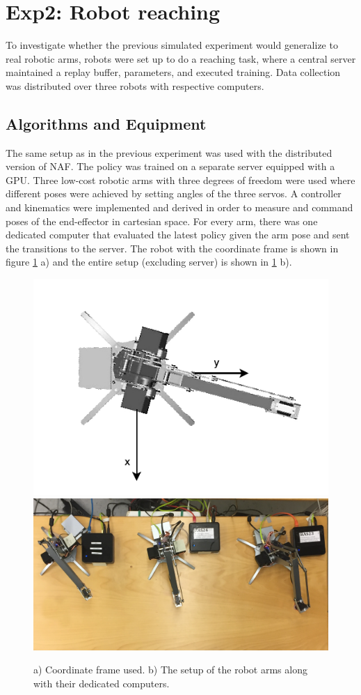 \section{Exp2: Robot reaching}

To investigate whether the previous simulated experiment would generalize to
real robotic arms, robots were set up to do a reaching task, where a central
server maintained a replay buffer, parameters, and executed training. Data
collection was distributed over three robots with respective computers.

\subsection{Algorithms and Equipment}

The same setup as in the previous experiment was used with the distributed
version of NAF. The policy was trained on a separate server equipped with a
GPU. Three low-cost robotic arms with three degrees of freedom were used where
different poses were achieved by setting angles of the three servos. A
controller and kinematics were implemented and derived in order to measure and
command poses of the end-effector in cartesian space. For every arm, there was
one dedicated computer that evaluated the latest policy given
the arm pose and sent the transitions to the server. The robot with the
coordinate frame is shown in figure \ref{fig:uarm_coordinate_frame} a) and the
entire setup (excluding server) is shown in \ref{fig:uarm_coordinate_frame} b).

\begin{figure}[ht]
    \centering
    \includegraphics[width=0.39 \textwidth]{res/uarm_coordinates.pdf}
    \includegraphics[width=0.59 \textwidth]{res/uarm_moving_setup.png}

    \caption{a) Coordinate frame used. b) The setup of the robot arms along
    with their dedicated computers.}

    \label{fig:uarm_coordinate_frame}
    
\end{figure}

